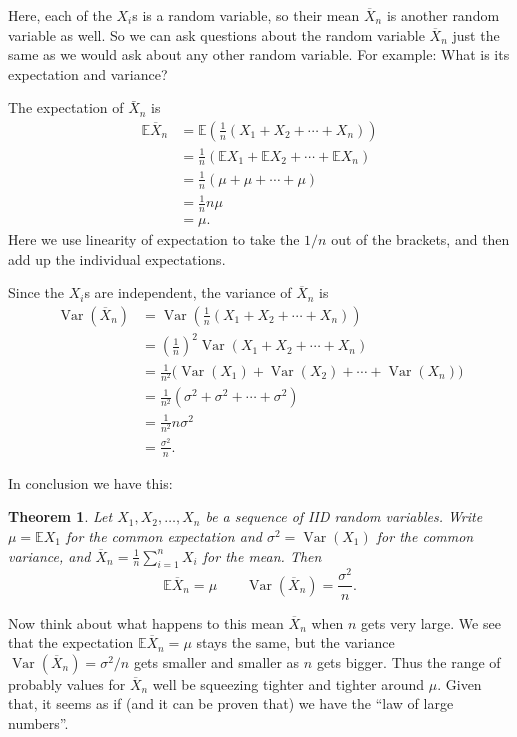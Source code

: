 \documentclass[
  a4paper,
]{book}
\newtheorem{theorem}{Theorem}[chapter]
\theoremstyle{definition}
\theoremstyle{definition}
\theoremstyle{definition}
\theoremstyle{definition}
\theoremstyle{remark}
\begin{document}
Here, each of the \(X_i\)s is a random variable, so their mean \(\overline X_n\) is another random variable as well. So we can ask questions about the random variable \(\overline X_n\) just the same as we would ask about any other random variable. For example: What is its expectation and variance?

The expectation of \(\bar X_n\) is
\begin{align*}
\mathbb E \overline X_n &= \mathbb E \left( \frac{1}{n} (X_1 + X_2 + \cdots + X_n)\right) \\
&=   \frac{1}{n} (\mathbb EX_1 + \mathbb EX_2 + \cdots + \mathbb EX_n)\\
&= \frac{1}{n} (\mu + \mu + \cdots + \mu)\\
&= \frac{1}{n} n \mu \\
&= \mu .
\end{align*}
Here we use linearity of expectation to take the \(1/n\) out of the brackets, and then add up the individual expectations.

Since the \(X_i\)s are independent, the variance of \(\overline X_n\) is
\begin{align*}
\operatorname{Var}( \overline X_n) &= \operatorname{Var}\left( \frac{1}{n} (X_1 + X_2 + \cdots + X_n)\right) \\
&= \left(\frac{1}{n}\right)^2 \operatorname{Var}(X_1 + X_2 + \cdots + X_n) \\
&=   \frac{1}{n^2} \big(\operatorname{Var}(X_1) + \operatorname{Var}(X_2) + \cdots + \operatorname{Var}(X_n)\big)\\
&= \frac{1}{n^2} (\sigma^2 + \sigma^2+ \cdots + \sigma^2)\\
&= \frac{1}{n^2} n \sigma^2 \\
&= \frac{\sigma^2}{n} .
\end{align*}

In conclusion we have this:

\begin{theorem}
Let \(X_1, X_2, \dots, X_n\) be a sequence of IID random variables. Write \(\mu = \mathbb EX_1\) for the common expectation and \(\sigma^2 = \operatorname{Var}(X_1)\) for the common variance, and
\(\overline X_n =\frac{1}{n} \sum_{i=1}^n X_i\) for the mean. Then
\[ \mathbb E \overline X_n = \mu \qquad \operatorname{Var}(\overline X_n) = \frac{\sigma^2}{n} . \]
\end{theorem}

Now think about what happens to this mean \(\overline X_n\) when \(n\) gets very large. We see that the expectation \(\mathbb E\overline X_n = \mu\) stays the same, but the variance \(\operatorname{Var}(\overline X_n) = \sigma^2/n\) gets smaller and smaller as \(n\) gets bigger. Thus the range of probably values for \(\overline X_n\) well be squeezing tighter and tighter around \(\mu\). Given that, it seems as if (and it can be proven that) we have the ``law of large numbers''.
\end{document}
